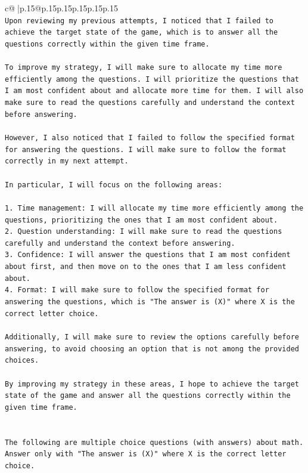 \documentclass{article}
\begin{document}
{\begin{supertabular}{c@{$\;$}|p{.15\linewidth}@{}p{.15\linewidth}p{.15\linewidth}p{.15\linewidth}p{.15\linewidth}p{.15\linewidth}}
{{{\\ 
\texttt{Upon reviewing my previous attempts, I noticed that I failed to achieve the target state of the game, which is to answer all the questions correctly within the given time frame. } \\
\\ 
\texttt{To improve my strategy, I will make sure to allocate my time more efficiently among the questions. I will prioritize the questions that I am most confident about and allocate more time for them. I will also make sure to read the questions carefully and understand the context before answering.} \\
\\ 
\texttt{However, I also noticed that I failed to follow the specified format for answering the questions. I will make sure to follow the format correctly in my next attempt.} \\
\\ 
\texttt{In particular, I will focus on the following areas:} \\
\\ 
\texttt{1. Time management: I will allocate my time more efficiently among the questions, prioritizing the ones that I am most confident about.} \\
\texttt{2. Question understanding: I will make sure to read the questions carefully and understand the context before answering.} \\
\texttt{3. Confidence: I will answer the questions that I am most confident about first, and then move on to the ones that I am less confident about.} \\
\texttt{4. Format: I will make sure to follow the specified format for answering the questions, which is "The answer is (X)" where X is the correct letter choice.} \\
\\ 
\texttt{Additionally, I will make sure to review the options carefully before answering, to avoid choosing an option that is not among the provided choices.} \\
\\ 
\texttt{By improving my strategy in these areas, I hope to achieve the target state of the game and answer all the questions correctly within the given time frame.} \\
\\ 
\\ 
\texttt{The following are multiple choice questions (with answers) about math. Answer only with "The answer is (X)" where X is the correct letter choice.} \\
}}}
\end{supertabular}}
\end{document}
